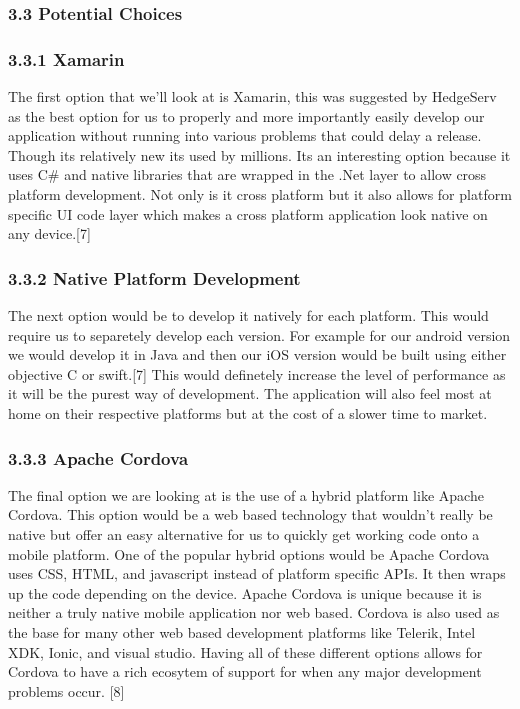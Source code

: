 \documentclass[onecolumn, draftclsnofoot,10pt, compsoc]{IEEEtran}
\begin{document}
\subsubsection{3.3 Potential Choices}

\subsubsection{3.3.1 Xamarin}
The first option that we'll look at is Xamarin, this was suggested by HedgeServ as the best option for us to properly and more importantly easily develop our application without running into various problems that could delay a release. Though its relatively new its used by millions. Its an interesting option because it uses C\# and native libraries that are wrapped in the .Net layer to allow cross platform development. Not only is it cross platform but it also allows for platform specific UI code layer which makes a cross platform application look native on any device.[7]

\subsubsection{3.3.2 Native Platform Development}
The next option would be to develop it natively for each platform. This would require us to separetely develop each version. For example for our android version we would develop it in Java and then our iOS version would be built using either objective C or swift.[7] This would definetely increase the level of performance as it will be the purest way of development. The application will also feel most at home on their respective platforms but at the cost of a slower time to market.

\subsubsection{3.3.3 Apache Cordova}
The final option we are looking at is the use of a hybrid platform like Apache Cordova. This option would be a web based technology that wouldn't really be native but offer an easy alternative for us to quickly get working code onto a mobile platform. One of the popular hybrid options would be Apache Cordova uses CSS, HTML, and javascript instead of platform specific APIs. It then wraps up the code depending on the device. Apache Cordova is unique because it is neither a truly native mobile application nor web based. Cordova is also used as the base for many other web based development platforms like Telerik, Intel XDK, Ionic, and visual studio. Having all of these different options allows for Cordova to have a rich ecosytem of support for when any major development problems occur. [8]
\end{document}
